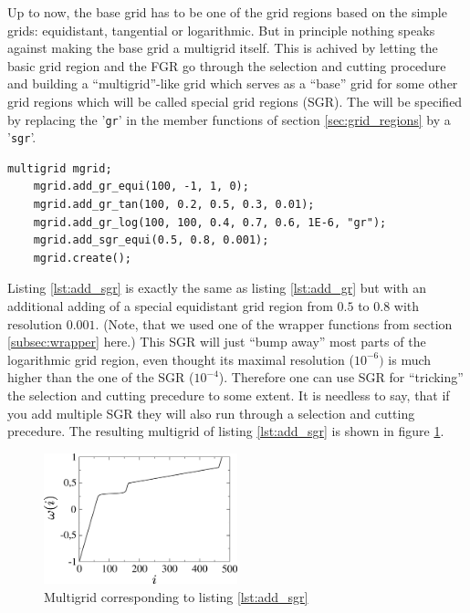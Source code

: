 Up to now, the base grid has to be one of the grid regions based on the simple grids: equidistant, tangential or logarithmic. But in principle nothing speaks against making the base grid a multigrid itself. This is achived by letting the basic grid region and the FGR go through the selection and cutting procedure and building a ``multigrid''-like grid which serves as a ``base'' grid for some other grid regions which will be called special grid regions (SGR). The will be specified by replacing the '\texttt{gr}' in the member functions of section \ref{sec:grid_regions} by a '\texttt{sgr}'.
\begin{lstlisting}[caption={Example for adding special grid regions},label={lst:add_sgr}]
	multigrid mgrid;
	mgrid.add_gr_equi(100, -1, 1, 0);
	mgrid.add_gr_tan(100, 0.2, 0.5, 0.3, 0.01);
	mgrid.add_gr_log(100, 100, 0.4, 0.7, 0.6, 1E-6, "gr");
	mgrid.add_sgr_equi(0.5, 0.8, 0.001);
	mgrid.create();
\end{lstlisting}
Listing \ref{lst:add_sgr} is exactly the same as listing \ref{lst:add_gr} but with an additional adding of a special equidistant grid region from $0.5$ to $0.8$ with resolution $0.001$. (Note, that we used one of the wrapper functions from section \ref{subsec:wrapper} here.) This SGR will just ``bump away'' most parts of the logarithmic grid region, even thought its maximal resolution ($10^{-6})$ is much higher than the one of the SGR ($10^{-4}$). Therefore one can use SGR for ``tricking'' the selection and cutting precedure to some extent. It is needless to say, that if you add multiple SGR they will also run through a selection and cutting precedure. The resulting multigrid of listing \ref{lst:add_sgr} is shown in figure \ref{fig:example_add_sgr}.
\begin{figure}[h]
	\centering
	\includegraphics[width=0.5\textwidth]{pics/example_add_sgr.eps}
	\caption{Multigrid corresponding to listing \ref{lst:add_sgr}}
	\label{fig:example_add_sgr}
\end{figure}


